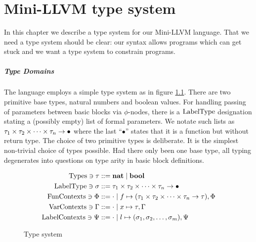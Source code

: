 \documentclass[a4paper, oneside, 10pt, draft]{memoir}
\begin{document}
\chapter{Mini-LLVM type system}
\label{chap:type-system}

In this chapter we describe a type system for our Mini-LLVM
language. That we need a type system should be clear: our syntax
allows programs which can get stuck and we want a type system to
constrain programs.

\paragraph{Type Domains} The language employs a simple type system as in
figure \ref{fig:type-system}. There are two primitive base types,
natural numbers and boolean values. For handling passing of parameters
between basic blocks via $\phi$-nodes, there is a $\mathrm{Label Type}$
designation stating a (possibly empty) list of formal parameters. We
notate such lists as $\tau_1 \times \tau_2 \times \dotsb \times \tau_n -> \bullet$ where the last
``$\bullet$'' states that it is a function but without return type.
The choice of two primitive types is deliberate. It is the simplest
non-trivial choice of types possible. Had there only been one base
type, all typing degenerates into questions on type arity in basic
block definitions.

\begin{figure}
  \begin{align*}
    \mathrm{Types} \ni \tau & ::= \mathbf{nat} \; \vert \; \mathbf{bool} \\
    \mathrm{Label Type} \ni \sigma   & ::= \tau_1 \times \tau_2 \times \dotsb \times \tau_n -> \bullet\\
    \mathrm{Fun Contexts} \ni \Phi & ::= \cdot \; \vert \; f \mapsto (\tau_1 \times \tau_2 \times \dotsb \times \tau_n -> \tau), \Phi \\
    \mathrm{Var Contexts} \ni \Gamma & ::= \cdot \; \vert \; x \mapsto \tau,\Gamma\\
    \mathrm{Label Contexts} \ni \Psi   & ::= \cdot \; \vert \; l \mapsto (\sigma_1, \sigma_2, \dotsc, \sigma_m),\Psi
  \end{align*}
  \caption{Type system}
  \label{fig:type-system}
\end{figure}

\newcommand{\tpr}{|-_{\mathrm{r}}}
\newcommand{\tpc}{|-_{\mathrm{c}}}
\newcommand{\tpop}{|-_{\mathrm{o}}}
\newcommand{\tpb}{|-_{\mathrm{b}}}
\end{document}
